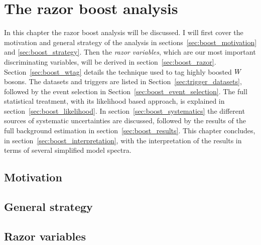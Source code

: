 \chapter{The razor boost analysis \label{chap:razorboost}}

In this chapter the razor boost analysis will be discussed. 
I will first cover the motivation and general strategy of the analysis in 
sections~\ref{sec:boost_motivation} and \ref{sec:boost_strategy}. Then the \textit{razor variables},
which are our most important discriminating variables, will be derived in 
section~\ref{sec:boost_razor}. Section~\ref{sec:boost_wtag} details the technique used to tag highly
boosted $W$ bosons. 
The datasets and triggers are listed in Section~\ref{sec:trigger_datasets}, followed by the event
selection in Section~\ref{sec:boost_event_selection}. 
The full statistical treatment, with its likelihood based approach, is explained in 
section~\ref{sec:boost_likelihood}. In section~\ref{sec:boost_systematics} the different sources of
systematic uncertainties are discussed, followed by the results of the full background estimation in
section~\ref{sec:boost_results}. This chapter concludes, in section~\ref{sec:boost_interpretation},
with the interpretation of the results in terms of several simplified model spectra. 

\section{Motivation \label{sec:boost_motivation}}




\section{General strategy \label{sec:boost_strategy}}




\section{Razor variables \label{sec:boost_razor}}




